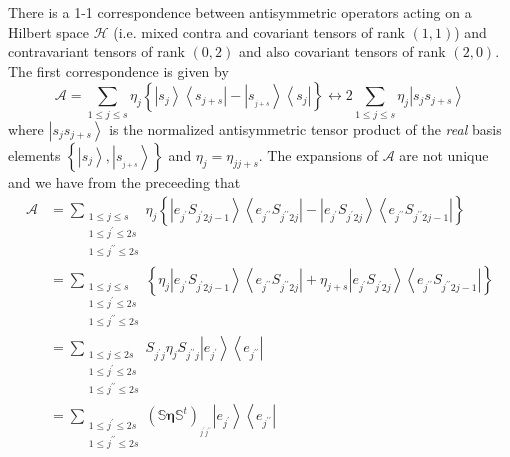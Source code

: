 \documentclass[aps,preprint]{revtex4}%
\begin{document}
There is a 1-1 correspondence between antisymmetric operators acting on a
Hilbert space $\mathcal{H}$ (i.e. mixed contra and covariant tensors of rank
$\left(  1,1\right)  $) and contravariant tensors of rank $\left(  0,2\right)
$ and also covariant tensors of rank $\left(  2,0\right)  $. The first
correspondence is given by
\begin{equation}
\mathcal{A}=\sum_{1\leq j\leq s}\eta_{j}\left\{  \left\vert s_{j}\right\rangle
\left\langle s_{j+s}\right\vert -\left\vert s_{_{j+s}}\right\rangle
\left\langle s_{j}\right\vert \right\}  \leftrightarrow2\sum_{1\leq j\leq
s}\eta_{j}\left\vert s_{j}s_{j+s}\right\rangle \label{contra}%
\end{equation}
where $\left\vert s_{j}s_{j+s}\right\rangle $ is the normalized antisymmetric
tensor product of the \emph{real }basis elements $\left\{  \left\vert
s_{j}\right\rangle ,\left\vert s_{_{j+s}}\right\rangle \right\}  $ and
$\eta_{j}=\eta_{jj+s}$. The expansions of $\mathcal{A}$ are not unique and we
have from the preceeding that%
\begin{align}
\mathcal{A}  & =\sum_{\substack{1\leq j\leq s \\1\leq j^{\prime}\leq2s \\1\leq
j^{\prime\prime}\leq2s }}\eta_{j}\left\{  \left\vert e_{j^{\prime}%
}S_{j^{\prime}2j-1}\right\rangle \left\langle e_{j^{\prime\prime}}%
S_{j^{\prime\prime}2j}\right\vert -\left\vert e_{j^{\prime}}S_{j^{\prime}%
2j}\right\rangle \left\langle e_{j^{\prime\prime}}S_{j^{\prime\prime}%
2j-1}\right\vert \right\} \nonumber\\
& =\sum_{\substack{1\leq j\leq s \\1\leq j^{\prime}\leq2s \\1\leq
j^{\prime\prime}\leq2s }}\left\{  \eta_{j}\left\vert e_{j^{\prime}%
}S_{j^{\prime}2j-1}\right\rangle \left\langle e_{j^{\prime\prime}}%
S_{j^{\prime\prime}2j}\right\vert +\eta_{j+s}\left\vert e_{j^{\prime}%
}S_{j^{\prime}2j}\right\rangle \left\langle e_{j^{\prime\prime}}%
S_{j^{\prime\prime}2j-1}\right\vert \right\} \nonumber\\
& =\sum_{\substack{1\leq j\leq2s \\1\leq j^{\prime}\leq2s \\1\leq
j^{\prime\prime}\leq2s }}S_{j^{\prime}j}\eta_{j}S_{j^{\prime\prime}%
j}\left\vert e_{j^{\prime}}\right\rangle \left\langle e_{j^{\prime\prime}%
}\right\vert \nonumber\\
& =\sum_{\substack{1\leq j^{\prime}\leq2s \\1\leq j^{\prime\prime}\leq2s
}}\left(  \mathbb{S}\mathbf{\eta}\mathbb{S}^{t}\right)  _{_{j^{\prime
}j^{\prime\prime}}}\left\vert e_{j^{\prime}}\right\rangle \left\langle
e_{j^{\prime\prime}}\right\vert
\end{align}
\end{document}
